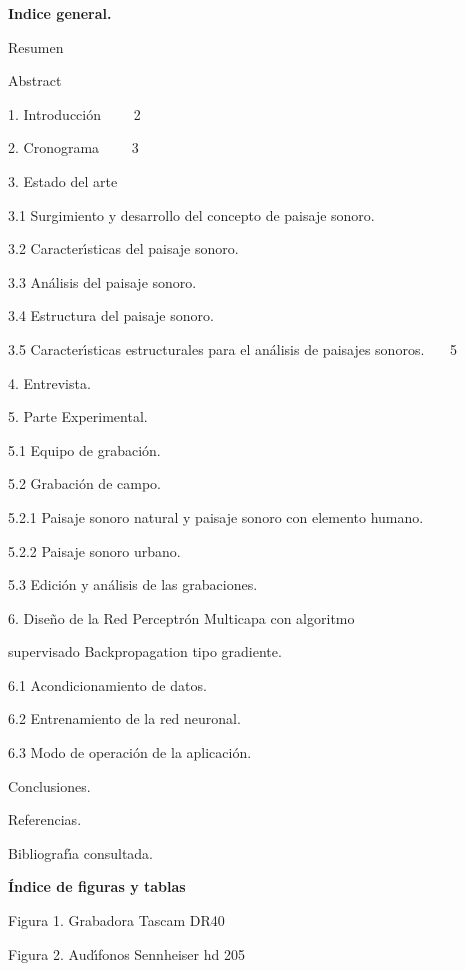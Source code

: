 \textbf{Indice general. }

Resumen 

Abstract\qquad\qquad\qquad\qquad\qquad\qquad\qquad\qquad\qquad{}

1. Introducci\'{o}n\qquad\qquad\qquad\qquad\qquad\qquad\qquad\qquad
\qquad\qquad\qquad\qquad\ \ \ \ 2

2. Cronograma\qquad\qquad\qquad\qquad\qquad\qquad\qquad\qquad\ \qquad
\qquad\qquad\qquad\ \ \ 3

3. Estado del arte\qquad\qquad\qquad\qquad\qquad\qquad\qquad\qquad\qquad
\qquad\qquad{}

3.1 Surgimiento y desarrollo del concepto de paisaje sonoro.

3.2 Caracter\'{\i}sticas del paisaje sonoro.

3.3 An\'{a}lisis del paisaje sonoro.

3.4 Estructura del paisaje sonoro.

3.5 Caracter\'{\i}sticas estructurales para el an\'{a}lisis de paisajes
sonoros. \ \ \ 5

4. Entrevista.

5. Parte Experimental.

5.1 Equipo de grabaci\'{o}n.

5.2 Grabaci\'{o}n de campo.

5.2.1 Paisaje sonoro natural y paisaje sonoro con elemento humano.

5.2.2 Paisaje sonoro urbano.

5.3 Edici\'{o}n y an\'{a}lisis de las grabaciones.

6. Dise\~{n}o de la Red Perceptr\'{o}n Multicapa con algoritmo

supervisado Backpropagation tipo gradiente.

6.1 Acondicionamiento de datos.

6.2 Entrenamiento de la red neuronal.

6.3 Modo de operaci\'{o}n de la aplicaci\'{o}n.

Conclusiones.

Referencias.

Bibliograf\'{\i}a consultada.

\textbf{\'{I}ndice de figuras y tablas}

Figura 1. Grabadora Tascam DR40

Figura 2. Aud\'{\i}fonos Sennheiser hd 205

